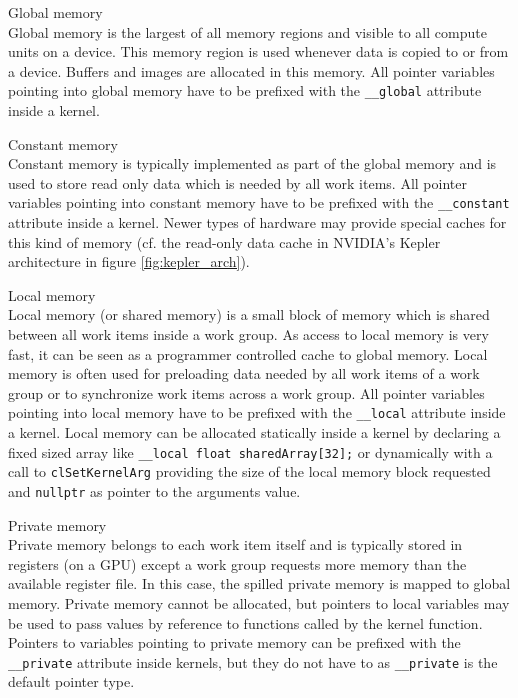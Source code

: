 \begin{numbereddescription}
	\item[Global memory] \hfill \\
	Global memory is the largest of all memory regions and visible to all compute units on a device. This memory region is used whenever data is copied to or from a device. Buffers and images are allocated in this memory. All pointer variables pointing into global memory have to be prefixed with the \lstinline!__global! attribute inside a kernel. \cite[p.29]{opencl_book}
	
	\pagebreak
	
	\item[Constant memory] \hfill \\
	Constant memory is typically implemented as part of the global memory and is used to store read only data which is needed by all work items. All pointer variables pointing into constant memory have to be prefixed with the \lstinline!__constant! attribute inside a kernel. \cite[p.30]{opencl_book} Newer types of hardware may provide special caches for this kind of memory (cf. the read-only data cache in NVIDIA's Kepler architecture in figure \ref{fig:kepler_arch}).
	
	\item[Local memory] \hfill \\
	Local memory (or shared memory) is a small block of memory which is shared between all work items inside a work group. As access to local memory is very fast, it can be seen as a programmer controlled cache to global memory. Local memory is often used for preloading data needed by all work items of a work group or to synchronize work items across a work group. All pointer variables pointing into local memory have to be prefixed with the \lstinline!__local! attribute inside a kernel. Local memory can be allocated statically inside a kernel by declaring a fixed sized array like \lstinline!__local float sharedArray[32];! or dynamically with a call to \lstinline!clSetKernelArg! providing the size of the local memory block requested and \lstinline!nullptr! as pointer to the arguments value. \cite[p.30]{opencl_book}

	\item[Private memory] \hfill \\
	Private memory belongs to each work item itself and is typically stored in registers (on a GPU) except a work group requests more memory than the available register file. In this case, the spilled private memory is mapped to global memory. Private memory cannot be allocated, but pointers to local variables may be used to pass values by reference to functions called by the kernel function. Pointers to variables pointing to private memory can be prefixed with the \lstinline!__private! attribute inside kernels, but they do not have to as \lstinline!__private! is the default pointer type. \cite[p.30]{opencl_book}
\end{numbereddescription}

